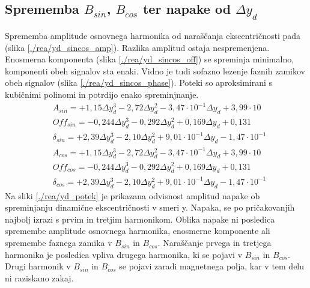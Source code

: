 \subsection{Sprememba $B_{sin}$, $B_{cos}$ ter napake od $\Delta y_d$}
Sprememba amplitude osnovnega harmonika od naraščanja ekscentričnosti pada (slika \ref{./rea/yd_sincos_amp}). Razlika amplitud ostaja nespremenjena. Enosmerna komponenta (slika \ref{./rea/yd_sincos_off}) se spreminja minimalno, komponenti obeh signalov sta enaki. Vidno je tudi sofazno lezenje faznih zamikov obeh signalov (slika \ref{./rea/yd_sincos_phase}). Poteki so aproksimirani s kubičnimi polinomi in potrdijo enako spreminjnanje.
\begin{eqnarray}
&A_{sin} = +1,15\Delta y_d^3-2,72\Delta y_d^2-3,47\cdot 10^{-1}\Delta y_d+3,99\cdot 10\\     
&Off_{sin} = -0,244\Delta y_d^3-0,292\Delta y_d^2+0,169\Delta y_d+0,131\\   
&\delta_{sin} = +2,39\Delta y_d^3-2,10\Delta y_d^2+9,01\cdot 10^{-1}\Delta y_d-1,47\cdot 10^{-1}\\
&A_{cos} = +1,15\Delta y_d^3-2,72\Delta y_d^2-3,47\cdot 10^{-1}\Delta y_d+3,99\cdot 10\\     
&Off_{cos} = -0,244\Delta y_d^3-0,292\Delta y_d^2+0,169\Delta y_d+0,131\\   
&\delta_{cos} = +2,39\Delta y_d^3-2,10\Delta y_d^2+9,01\cdot 10^{-1}\Delta y_d-1,47\cdot 10^{-1} 
\end{eqnarray}
Na sliki \ref{./rea/yd_potek} je prikazana odvisnost amplitud napake ob spreminjanju dinamične ekscentričnosti v smeri y. Napaka, se po pričakovanjih najbolj izrazi s prvim in tretjim harmonikom. Oblika napake ni posledica spremembe amplitude osnovnega harmonika, enosmerne komponente ali spremembe faznega zamika v $B_{sin}$ in $B_{cos}$. Naraščanje prvega in tretjega harmonika je posledica vpliva drugega harmonika, ki se pojavi v $B_{sin}$ in $B_{cos}$. Drugi harmonik v $B_{sin}$ in $B_{cos}$ se pojavi zaradi magnetnega polja, kar v tem delu ni raziskano zakaj.
